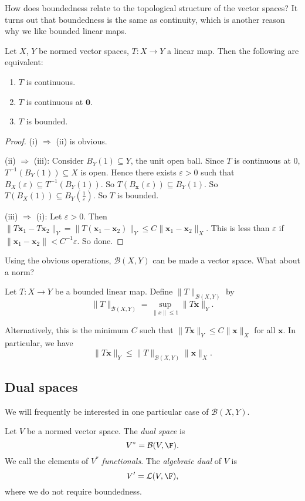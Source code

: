 \documentclass[a4paper]{article}
\begin{document}
How does boundedness relate to the topological structure of the vector spaces? It turns out that boundedness is the same as continuity, which is another reason why we like bounded linear maps.

\begin{prop}
  Let $X$, $Y$ be normed vector spaces, $T: X\to Y$ a linear map. Then the following are equivalent:
  \begin{enumerate}
    \item $T$ is continuous.
    \item $T$ is continuous at $\mathbf{0}$.
    \item $T$ is bounded.
  \end{enumerate}
\end{prop}

\begin{proof}
  (i) $\Rightarrow$ (ii) is obvious.

  (ii) $\Rightarrow $ (iii): Consider $B_Y(1) \subseteq Y$, the unit open ball. Since $T$ is continuous at $0$, $T^{-1}(B_Y(1))\subseteq X$ is open. Hence there exists $\varepsilon > 0$ such that $B_X(\varepsilon) \subseteq T^{-1}(B_Y(1))$. So $T(B_\mathbf{x}(\varepsilon)) \subseteq B_Y(1)$. So $T(B_X(1)) \subseteq B_Y\left(\frac{1}{\varepsilon}\right)$. So $T$ is bounded.

  (iii) $\Rightarrow$ (i): Let $\varepsilon > 0$. Then $\|T \mathbf{x}_1 - T \mathbf{x}_2\|_Y = \|T(\mathbf{x}_1 - \mathbf{x}_2)\|_Y \leq C\|\mathbf{x}_1 - \mathbf{x}_2\|_X$. This is less than $\varepsilon$ if $\|\mathbf{x}_1 - \mathbf{x}_2\| < C^{-1}\varepsilon$. So done.
\end{proof}

Using the obvious operations, $\mathcal{B}(X, Y)$ can be made a vector space. What about a norm?

\begin{defi}
  Let $T: X\to Y$ be a bounded linear map. Define $\|T\|_{\mathcal{B}(X, Y)}$ by
  \[
    \|T\|_{\mathcal{B}(X, Y)} = \sup_{\|x\| \leq 1} \|T \mathbf{x}\|_Y.
  \]
\end{defi}
Alternatively, this is the minimum $C$ such that $\|T\mathbf{x}\|_Y \leq C\|\mathbf{x}\|_X$ for all $\mathbf{x}$. In particular, we have
\[
  \|T\mathbf{x}\|_Y \leq \|T\|_{\mathcal{B}(X, Y)}\|\mathbf{x}\|_X.
\]
\subsection{Dual spaces}
We will frequently be interested in one particular case of $\mathcal{B}(X, Y)$.
\begin{defi}
  Let $V$ be a normed vector space. The \emph{dual space} is
  \[
    V^* = \mathcal{B}(V, \F).
  \]
  We call the elements of $V^*$ \emph{functionals}. The \emph{algebraic dual} of $V$ is
  \[
    V' = \mathcal{L}(V, \F),
  \]
  where we do not require boundedness.
\end{defi}
\end{document}
